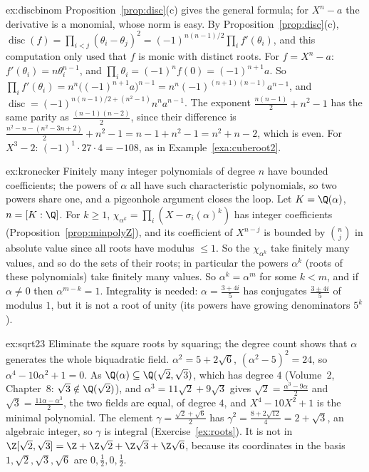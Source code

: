 \begin{solution}{ex:discbinom}
\idea Proposition~\ref{prop:disc}(c) gives the general formula; for $X^n-a$ the derivative is a monomial, whose norm is
easy.
\writeup By Proposition~\ref{prop:disc}(c), $\operatorname{disc}(f)=\prod_{i<j}(\theta_i-\theta_j)^2=(-1)^{n(n-1)/2}
\prod_if'(\theta_i)$, and this computation only used that $f$ is monic with distinct roots. For $f=X^n-a$:
$f'(\theta_i)=n\theta_i^{n-1}$, and $\prod_i\theta_i=(-1)^nf(0)=(-1)^{n+1}a$. So
$\prod_if'(\theta_i)=n^n\bigl((-1)^{n+1}a\bigr)^{n-1}=n^n(-1)^{(n+1)(n-1)}a^{n-1}$, and
$\operatorname{disc}=(-1)^{n(n-1)/2+(n^2-1)}n^na^{n-1}$. The exponent $\frac{n(n-1)}2+n^2-1$ has the same parity as
$\frac{(n-1)(n-2)}2$, since their difference is $\frac{n^2-n-(n^2-3n+2)}2+n^2-1=n-1+n^2-1=n^2+n-2$, which is even. For
$X^3-2$: $(-1)^1\cdot27\cdot4=-108$, as in Example~\ref{exa:cuberoot2}.
\end{solution}

\begin{solution}{ex:kronecker}
\idea Finitely many integer polynomials of degree $n$ have bounded coefficients; the powers of $\alpha$ all have such
characteristic polynomials, so two powers share one, and a pigeonhole argument closes the loop.
\writeup Let $K=\Q(\alpha)$, $n=[K:\Q]$. For $k\ge1$, $\chi_{\alpha^k}=\prod_i(X-\sigma_i(\alpha)^k)$ has integer
coefficients (Proposition~\ref{prop:minpolyZ}), and its coefficient of $X^{n-j}$ is bounded by $\binom nj$ in absolute
value since all roots have modulus $\le1$. So the $\chi_{\alpha^k}$ take finitely many values, and so do the sets of
their roots; in particular the powers $\alpha^k$ (roots of these polynomials) take finitely many values. So
$\alpha^k=\alpha^m$ for some $k<m$, and if $\alpha\ne0$ then $\alpha^{m-k}=1$. Integrality is needed: $\alpha=
\frac{3+4i}5$ has conjugates $\frac{3\pm4i}5$ of modulus $1$, but it is not a root of unity (its powers have growing
denominators $5^k$).
\end{solution}

\begin{solution}{ex:sqrt23}
\idea Eliminate the square roots by squaring; the degree count shows that $\alpha$ generates the whole biquadratic field.
\writeup $\alpha^2=5+2\sqrt6$, $(\alpha^2-5)^2=24$, so $\alpha^4-10\alpha^2+1=0$. As $\Q(\alpha)\subseteq\Q(\sqrt2,\sqrt3)$,
which has degree $4$ (Volume~2, Chapter~8: $\sqrt3\notin\Q(\sqrt2)$), and $\alpha^3=11\sqrt2+9\sqrt3$ gives
$\sqrt2=\frac{\alpha^3-9\alpha}2$ and $\sqrt3=\frac{11\alpha-\alpha^3}2$, the two fields are equal, of degree $4$, and
$X^4-10X^2+1$ is the minimal polynomial. The element $\gamma=\frac{\sqrt2+\sqrt6}2$ has $\gamma^2=\frac{8+2\sqrt{12}}4=
2+\sqrt3$, an algebraic integer, so $\gamma$ is integral (Exercise~\ref{ex:roots}). It is not in
$\Z[\sqrt2,\sqrt3]=\Z+\Z\sqrt2+\Z\sqrt3+\Z\sqrt6$, because its coordinates in the basis $1,\sqrt2,\sqrt3,\sqrt6$ are
$0,\frac12,0,\frac12$.
\end{solution}

